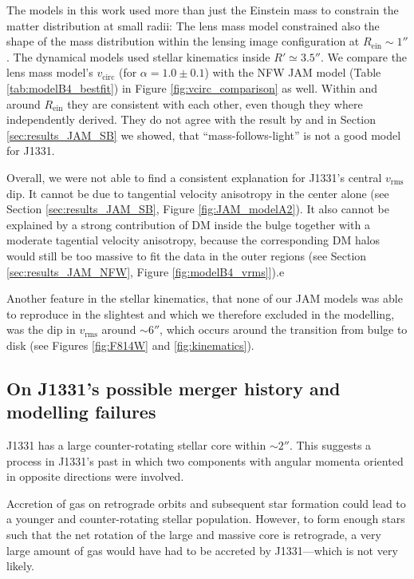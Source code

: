 \documentclass[useAMS,usenatbib]{mnras}
\begin{document}
The models in this work used more than just the Einstein mass to constrain the matter distribution at small radii: The lens mass model constrained also the shape of the mass distribution within the lensing image configuration at $R_\text{ein} \sim 1''$. The dynamical models used stellar kinematics inside $R' \simeq 3.5''$. We compare the lens mass model's $v_\text{circ}$ (for $\alpha=1.0\pm 0.1$) with the NFW JAM model (Table \ref{tab:modelB4_bestfit}) in Figure \ref{fig:vcirc_comparison} as well. Within and around $R_\text{ein}$ they are consistent with each other, even though they where independently derived. They do not agree with the result by \citet{SWELLSV} and in Section \ref{sec:results_JAM_SB} we showed, that ``mass-follows-light'' is not a good model for J1331.

Overall, we were not able to find a consistent explanation for J1331's central $v_\text{rms}$ dip. It cannot be due to tangential velocity anisotropy in the center alone (see Section \ref{sec:results_JAM_SB}, Figure \ref{fig:JAM_modelA2}). It also cannot be explained by a strong contribution of DM inside the bulge together with a moderate tagential velocity anisotropy, because the corresponding DM halos would still be too massive to fit the data in the outer regions (see Section \ref{sec:results_JAM_NFW}, Figure \ref{fig:modelB4_vrms}]).e

Another feature in the stellar kinematics, that none of our JAM models was able to reproduce in the slightest and which we therefore excluded in the modelling, was the dip in $v_\text{rms}$ around $\sim 6''$, which occurs around the transition from bulge to disk (see Figures \ref{fig:F814W} and \ref{fig:kinematics}).

\subsection{On J1331's possible merger history and modelling failures}

J1331 has a large counter-rotating stellar core within $\sim 2''$. This suggests a process in J1331's past in which two components with angular momenta oriented in opposite directions were involved.

Accretion of gas on retrograde orbits and subsequent star formation could lead to a younger and counter-rotating stellar population. However, to form enough stars such that the net rotation of the large and massive core is retrograde, a very large amount of gas would have had to be accreted by J1331---which is not very likely. 
\end{document}
